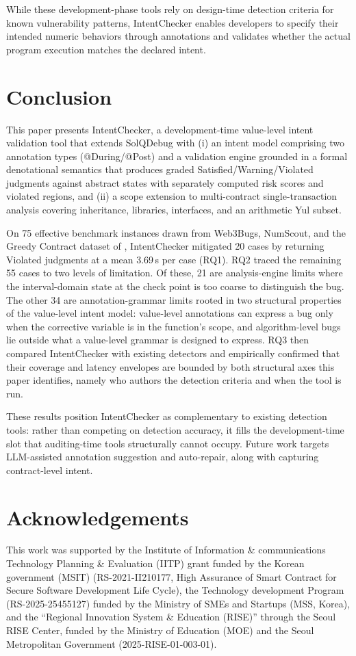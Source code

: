 \documentclass[pdflatex,sn-basic]{sn-jnl}%
\theoremstyle{thmstyleone}%
\theoremstyle{thmstyletwo}%
\theoremstyle{thmstylethree}%
\begin{document}
While these development-phase tools rely on design-time detection criteria for known vulnerability patterns,
IntentChecker enables developers to specify their intended numeric behaviors through annotations and validates whether the actual program execution matches the declared intent.

\section{Conclusion}\label{sec:conclusion}

This paper presents IntentChecker, a development-time value-level intent validation tool that extends SolQDebug with (i) an intent model comprising two annotation types (@During/@Post) and a validation engine grounded in a formal denotational semantics that produces graded Satisfied/Warning/Violated judgments against abstract states with separately computed risk scores and violated regions, and (ii) a scope extension to multi-contract single-transaction analysis covering inheritance, libraries, interfaces, and an arithmetic Yul subset.

On 75 effective benchmark instances drawn from Web3Bugs, NumScout, and the Greedy Contract dataset of \citet{flyinointment}, IntentChecker mitigated 20 cases by returning Violated judgments at a mean 3.69\,s per case (RQ1). RQ2 traced the remaining 55 cases to two levels of limitation. Of these, 21 are analysis-engine limits where the interval-domain state at the check point is too coarse to distinguish the bug. The other 34 are annotation-grammar limits rooted in two structural properties of the value-level intent model: value-level annotations can express a bug only when the corrective variable is in the function's scope, and algorithm-level bugs lie outside what a value-level grammar is designed to express. RQ3 then compared IntentChecker with existing detectors and empirically confirmed that their coverage and latency envelopes are bounded by both structural axes this paper identifies, namely who authors the detection criteria and when the tool is run.

These results position IntentChecker as complementary to existing detection tools: rather than competing on detection accuracy, it fills the development-time slot that auditing-time tools structurally cannot occupy. Future work targets LLM-assisted annotation suggestion and auto-repair, along with capturing contract-level intent.

\section*{Acknowledgements}
This work was supported by the Institute of Information \& communications Technology Planning \& Evaluation (IITP) grant funded by the Korean government (MSIT) (RS-2021-II210177, High Assurance of Smart Contract for Secure Software Development Life Cycle), the Technology development Program (RS-2025-25455127) funded by the Ministry of SMEs and Startups (MSS, Korea), and the ``Regional Innovation System \& Education (RISE)'' through the Seoul RISE Center, funded by the Ministry of Education (MOE) and the Seoul Metropolitan Government (2025-RISE-01-003-01).
\end{document}
